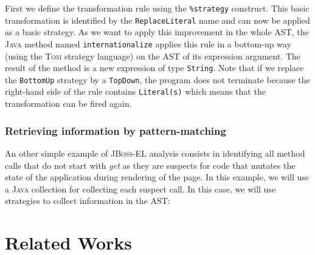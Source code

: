 \documentclass[runningheads]{llncs}
\newcommand{\jbossel}{\textsc{JBoss-EL}}
\newcommand{\tom}{\textsc{Tom}}
\newcommand{\java}{\textsc{Java}}
\begin{document}

First we define the transformation rule using the \verb+%strategy+ construct.
This basic transformation is identified by the \texttt{ReplaceLiteral} name and
can now be applied as a basic strategy. As we want to apply this improvement in
the whole AST, the {\java} method named \texttt{internationalize} applies this
rule in a bottom-up way (using the {\tom} strategy language) on the AST of its
expression argument. The result of the method is a new expression of type
\texttt{String}. Note that if we replace the \verb+BottomUp+ strategy by a
\verb+TopDown+, the program does not terminate because the right-hand side of
the rule contains \verb+Literal(s)+ which means that the transformation can be
fired again.

\subsubsection{Retrieving information by pattern-matching}

An other simple example of {\jbossel} analysis consists in identifying all
method calls that do not start with \emph{get} as they are suspects for code
that mutates the state of the application during rendering of the page. In this
example, we will use a {\java} collection for collecting each suspect call. In
this case, we will use strategies to collect information in the AST:



\section{Related Works}
\end{document}
